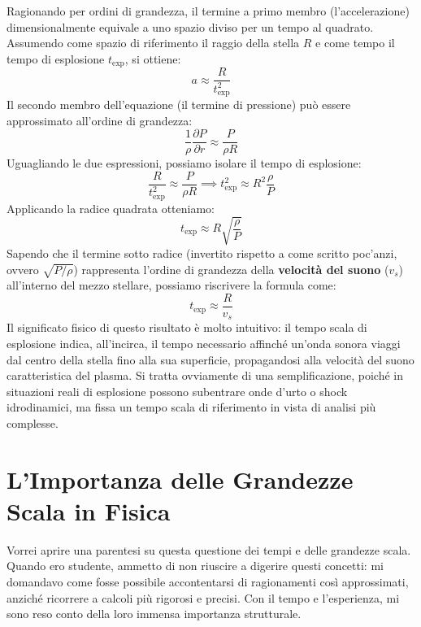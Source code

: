 Ragionando per ordini di grandezza, il termine a primo membro (l'accelerazione) dimensionalmente equivale a uno spazio diviso per un tempo al quadrato. Assumendo come spazio di riferimento il raggio della stella $R$ e come tempo il tempo di esplosione $t_{\text{exp}}$, si ottiene:
\begin{equation}
a \approx \frac{R}{t_{\text{exp}}^2}
\end{equation}
Il secondo membro dell'equazione (il termine di pressione) può essere approssimato all'ordine di grandezza:
\begin{equation}
\frac{1}{\rho} \frac{\partial P}{\partial r} \approx \frac{P}{\rho R}
\end{equation}
Uguagliando le due espressioni, possiamo isolare il tempo di esplosione:
\begin{equation}
\frac{R}{t_{\text{exp}}^2} \approx \frac{P}{\rho R} \implies t_{\text{exp}}^2 \approx R^2 \frac{\rho}{P}
\end{equation}
Applicando la radice quadrata otteniamo:
\begin{equation}
t_{\text{exp}} \approx R \sqrt{\frac{\rho}{P}}
\end{equation}
Sapendo che il termine sotto radice (invertito rispetto a come scritto poc'anzi, ovvero $\sqrt{P/\rho}$) rappresenta l'ordine di grandezza della \textbf{velocità del suono} ($v_s$) all'interno del mezzo stellare, possiamo riscrivere la formula come:
\begin{equation}
t_{\text{exp}} \approx \frac{R}{v_s}
\end{equation}
Il significato fisico di questo risultato è molto intuitivo: il tempo scala di esplosione indica, all'incirca, il tempo necessario affinché un'onda sonora viaggi dal centro della stella fino alla sua superficie, propagandosi alla velocità del suono caratteristica del plasma. Si tratta ovviamente di una semplificazione, poiché in situazioni reali di esplosione possono subentrare onde d'urto o shock idrodinamici, ma fissa un tempo scala di riferimento in vista di analisi più complesse.

\section{L'Importanza delle Grandezze Scala in Fisica}
Vorrei aprire una parentesi su questa questione dei tempi e delle grandezze scala. Quando ero studente, ammetto di non riuscire a digerire questi concetti: mi domandavo come fosse possibile accontentarsi di ragionamenti così approssimati, anziché ricorrere a calcoli più rigorosi e precisi. Con il tempo e l'esperienza, mi sono reso conto della loro immensa importanza strutturale.

